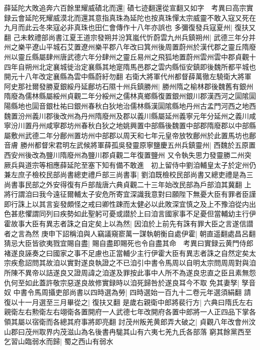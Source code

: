 薛延陀大敗追奔六百餘里耀威磧北而還|{
	磧七迹翻還從宣翻又如字　考異曰高宗實録云會延陀死耀威漠北而還其意指真珠為延陀也按真珠憚太宗威靈不敢入寇又死在九月而此云冬來寇必非真珠也田仁會傳作十八年亦誤也}
多彌復發兵寇夏州|{
	復扶又翻}
己未敕禮部尚書江夏王道宗發朔并汾箕嵐代忻蔚雲九州兵鎮朔州|{
	武德三年分并州之樂平遼山平城石艾置遼州樂平郡八年改曰箕州後周置蔚州於漢代郡之靈丘隋廢州以靈丘縣屬肆州唐武德六年分肆州之靈丘易州之飛狐地置蔚州雲州雲中郡貞觀十四年自朔州北定襄城徙治定襄縣其地寔隋馬邑郡之雲内縣恒安鎮即後魏所都平城也開元十八年改定襄縣為雲中縣蔚紆勿翻}
右衛大將軍代州都督薛萬徹左驍衛大將軍阿史那社爾發勝夏銀綏丹延鄜坊石隰十州兵鎮勝州|{
	勝州隋之榆林郡後魏舊有銀州隋廢為儒林縣屬綏州貞觀二年分綏州之儒林真鄉縣復置銀州銀川郡漢西河之圁隂圁陽縣地也圁音銀杜祐曰銀州春秋白狄地治儒林縣漢圁隂縣地丹州古孟門河西之地西魏置汾州義川郡後改州為丹州隋廢州及郡以義川縣屬延州義寧元年分延州之義川咸寧汾川置丹州咸寧郡坊州春秋白狄之地姚興置中部縣後魏置中部郡隋廢郡以中部縣屬敷州武德二年分鄜州置坊州中部郡以周天和七年元皇帝放牧鄜州於此置馬坊也鄜音膚}
勝州都督宋君明左武候將軍薛孤吳發靈原寧鹽慶五州兵鎮靈州|{
	西魏於五原置西安州後改為鹽川隋廢州為鹽川郡貞觀二年復置鹽州}
又令執失思力發靈勝二州突厥兵與道宗等相應薛延陀至塞下知有備不敢進　初上留侍中劉洎輔皇太子於定州仍兼左庶子檢校民部尚書總吏禮戶部三尚書事|{
	劉洎既檢校民部尚書又總吏禮是為三尚書事民部之外安得復有戶部哉唐六典貞觀二十三年始改民部為戶部洎其冀翻}
上將行謂洎曰我今遠征爾輔太子安危所寄宜深識我意對曰願陛下無憂大臣有罪者臣謹即行誅上以其言妄發頗怪之戒曰卿性踈而太健必以此敗深宜慎之及上不豫洎從内出色甚悲懼謂同列曰疾勢如此聖躬可憂或譛於上曰洎言國家事不足憂但當輔幼主行伊霍故事大臣有異志者誅之自定矣上以為然|{
	因洎於上前先有誅有罪大臣之言遂信譛者之言為然}
庚申下詔稱洎與人竊議窺窬萬一謀執朝衡自處伊霍|{
	朝直遥翻處昌呂翻}
猜忌大臣皆欲夷戮宜賜自盡|{
	賜自盡即賜死也令自盡其命　考異曰實録云黄門侍郎褚遂良誣奏之曰國家之事不足慮也正當輔少主行伊霍大臣有異志者誅之自然定矣太宗疾愈詔問其故洎以實對遂良執證之不已洎引中書令馬周以自明太宗問周周對與洎所陳不異帝以詰遂良又證周諱之洎遂及罪按此事中人所不為遂良忠直之臣且素無怨仇何至如此蓋許敬宗惡遂良故修實録時以洎死歸咎於遂良耳今不取}
免其妻孥|{
	孥音奴}
中書令馬周攝吏部尚書以四時選為勞|{
	四時選始一百九十二卷元年選須絹翻}
請復以十一月選至三月畢從之|{
	復扶又翻}
是歲右親衛中郎將裴行方|{
	六典曰隋氏左右親衛左右勲衛左右翊衛各置開府一人武德七年改開府各置中郎將一人正四品下掌各領其屬以宿衛而各總其府事將即亮翻}
討茂州叛羌黄郎弄大破之|{
	貞觀八年改會州汶山郡曰茂州取界内茂滋山為名後書冉駹其山有六夷七羌九氏各部落}
窮其餘黨西至乞習山臨弱水而歸|{
	蜀之西山有弱水}


